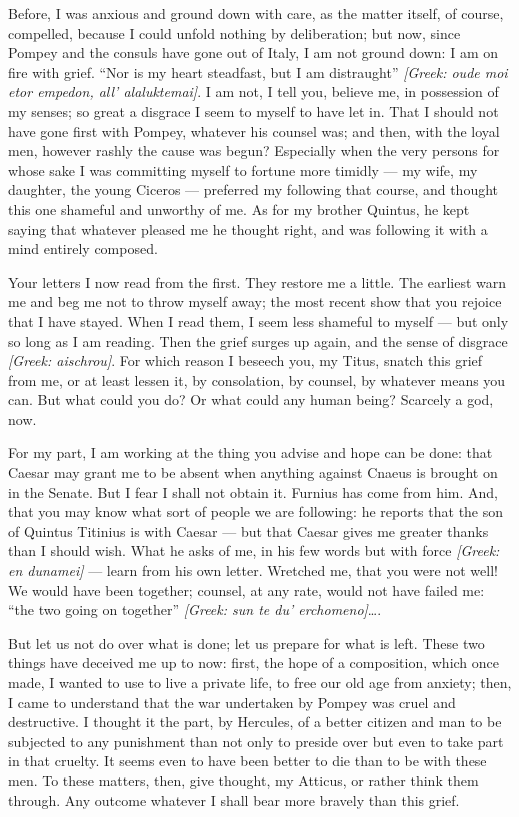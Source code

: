  Before, I was anxious and ground down with care, as the matter itself, of course, compelled, because I could unfold nothing by deliberation; but now, since Pompey and the consuls have gone out of Italy, I am not ground down: I am on fire with grief. ``Nor is my heart steadfast, but I am distraught'' \textit{[Greek: oude moi etor empedon, all' alaluktemai]}. I am not, I tell you, believe me, in possession of my senses; so great a disgrace I seem to myself to have let in. That I should not have gone first with Pompey, whatever his counsel was; and then, with the loyal men, however rashly the cause was begun? Especially when the very persons for whose sake I was committing myself to fortune more timidly --- my wife, my daughter, the young Ciceros --- preferred my following that course, and thought this one shameful and unworthy of me. As for my brother Quintus, he kept saying that whatever pleased me he thought right, and was following it with a mind entirely composed.

 Your letters I now read from the first. They restore me a little. The earliest warn me and beg me not to throw myself away; the most recent show that you rejoice that I have stayed. When I read them, I seem less shameful to myself --- but only so long as I am reading. Then the grief surges up again, and the sense of disgrace \textit{[Greek: aischrou]}. For which reason I beseech you, my Titus, snatch this grief from me, or at least lessen it, by consolation, by counsel, by whatever means you can. But what could you do? Or what could any human being? Scarcely a god, now.

 For my part, I am working at the thing you advise and hope can be done: that Caesar may grant me to be absent when anything against Cnaeus is brought on in the Senate. But I fear I shall not obtain it. Furnius has come from him. And, that you may know what sort of people we are following: he reports that the son of Quintus Titinius is with Caesar --- but that Caesar gives me greater thanks than I should wish. What he asks of me, in his few words but with force \textit{[Greek: en dunamei]} --- learn from his own letter. Wretched me, that you were not well! We would have been together; counsel, at any rate, would not have failed me: ``the two going on together'' \textit{[Greek: sun te du' erchomeno]}\ldots.

 But let us not do over what is done; let us prepare for what is left. These two things have deceived me up to now: first, the hope of a composition, which once made, I wanted to use to live a private life, to free our old age from anxiety; then, I came to understand that the war undertaken by Pompey was cruel and destructive. I thought it the part, by Hercules, of a better citizen and man to be subjected to any punishment than not only to preside over but even to take part in that cruelty. It seems even to have been better to die than to be with these men. To these matters, then, give thought, my Atticus, or rather think them through. Any outcome whatever I shall bear more bravely than this grief.
